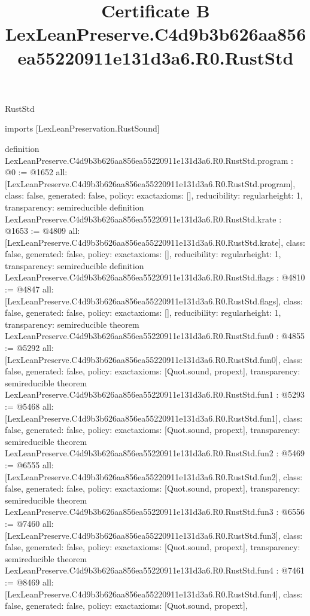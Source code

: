 \begin{lexlean}{RustStd}
\title{Certificate B LexLeanPreserve.C4d9b3b626aa856ea55220911e131d3a6.R0.RustStd}
\begin{coremodule}
imports [LexLeanPreservation.RustSound]

definition LexLeanPreserve.C4d9b3b626aa856ea55220911e131d3a6.R0.RustStd.program : @0 := @1652 {
  all: [LexLeanPreserve.C4d9b3b626aa856ea55220911e131d3a6.R0.RustStd.program],
  class: false,
  generated: false,
  policy: exact{axioms: []},
  reducibility: regular{height: 1},
  transparency: semireducible
}
definition LexLeanPreserve.C4d9b3b626aa856ea55220911e131d3a6.R0.RustStd.krate : @1653 := @4809 {
  all: [LexLeanPreserve.C4d9b3b626aa856ea55220911e131d3a6.R0.RustStd.krate],
  class: false,
  generated: false,
  policy: exact{axioms: []},
  reducibility: regular{height: 1},
  transparency: semireducible
}
definition LexLeanPreserve.C4d9b3b626aa856ea55220911e131d3a6.R0.RustStd.flags : @4810 := @4847 {
  all: [LexLeanPreserve.C4d9b3b626aa856ea55220911e131d3a6.R0.RustStd.flags],
  class: false,
  generated: false,
  policy: exact{axioms: []},
  reducibility: regular{height: 1},
  transparency: semireducible
}
theorem LexLeanPreserve.C4d9b3b626aa856ea55220911e131d3a6.R0.RustStd.fun0 : @4855 := @5292 {
  all: [LexLeanPreserve.C4d9b3b626aa856ea55220911e131d3a6.R0.RustStd.fun0],
  class: false,
  generated: false,
  policy: exact{axioms: [Quot.sound, propext]},
  transparency: semireducible
}
theorem LexLeanPreserve.C4d9b3b626aa856ea55220911e131d3a6.R0.RustStd.fun1 : @5293 := @5468 {
  all: [LexLeanPreserve.C4d9b3b626aa856ea55220911e131d3a6.R0.RustStd.fun1],
  class: false,
  generated: false,
  policy: exact{axioms: [Quot.sound, propext]},
  transparency: semireducible
}
theorem LexLeanPreserve.C4d9b3b626aa856ea55220911e131d3a6.R0.RustStd.fun2 : @5469 := @6555 {
  all: [LexLeanPreserve.C4d9b3b626aa856ea55220911e131d3a6.R0.RustStd.fun2],
  class: false,
  generated: false,
  policy: exact{axioms: [Quot.sound, propext]},
  transparency: semireducible
}
theorem LexLeanPreserve.C4d9b3b626aa856ea55220911e131d3a6.R0.RustStd.fun3 : @6556 := @7460 {
  all: [LexLeanPreserve.C4d9b3b626aa856ea55220911e131d3a6.R0.RustStd.fun3],
  class: false,
  generated: false,
  policy: exact{axioms: [Quot.sound, propext]},
  transparency: semireducible
}
theorem LexLeanPreserve.C4d9b3b626aa856ea55220911e131d3a6.R0.RustStd.fun4 : @7461 := @8469 {
  all: [LexLeanPreserve.C4d9b3b626aa856ea55220911e131d3a6.R0.RustStd.fun4],
  class: false,
  generated: false,
  policy: exact{axioms: [Quot.sound, propext]},
}
\end{coremodule}
\end{lexlean}
